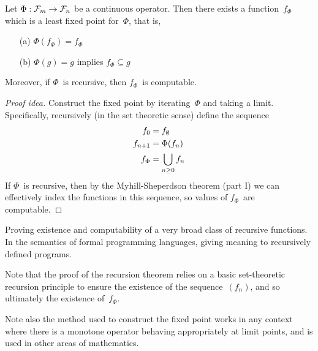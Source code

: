 \begin{thm}
Let \(\Phi:\mathcal{F}_m\to\mathcal{F}_n\) be a continuous operator. Then there exists a function~\(f_{\Phi}\) which is a least fixed point for~\(\Phi\), that is,
\begin{enumerate}[itemsep=0pt]
\item[(a)] \(\Phi(f_{\Phi})=f_{\Phi}\)
\item[(b)] \(\Phi(g)=g\) implies \(f_{\Phi}\subseteq g\)
\end{enumerate}
Moreover, if \(\Phi\)~is recursive, then \(f_{\Phi}\)~is computable.
\end{thm}
\begin{proof}[Proof idea]
Construct the fixed point by iterating~\(\Phi\) and taking a limit. Specifically, recursively (in the set theoretic sense) define the sequence
\begin{align*}
f_0&=f_{\emptyset}\\
f_{n+1}&=\Phi(f_n)\\
f_{\Phi}&=\bigcup_{n\ge0} f_n
\end{align*}
If \(\Phi\)~is recursive, then by the Myhill-Sheperdson theorem (part I) we can effectively index the functions in this sequence, so values of \(f_{\Phi}\)~are computable.
\end{proof}
\begin{app}
Proving existence and computability of a very broad class of recursive functions. In the semantics of formal programming languages, giving meaning to recursively defined programs.
\end{app}
\begin{rmk}
Note that the proof of the recursion theorem relies on a basic set-theoretic recursion principle to ensure the existence of the sequence~\((f_n)\), and so ultimately the existence of~\(f_{\Phi}\).

Note also the method used to construct the fixed point works in any context where there is a monotone operator behaving appropriately at limit points, and is used in other areas of mathematics.
\end{rmk}
